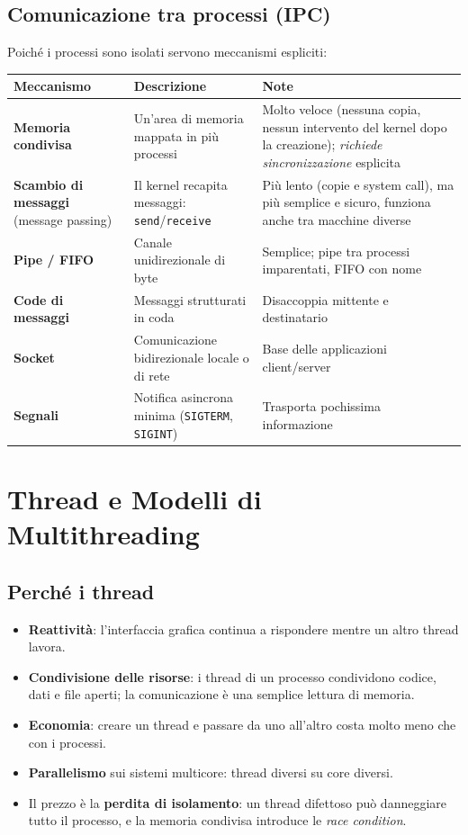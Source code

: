 \subsection{Comunicazione tra processi (IPC)}
Poiché i processi sono isolati servono meccanismi espliciti:
\begin{center}
\small
\begin{tabularx}{\textwidth}{@{}>{\raggedright\arraybackslash}p{3.3cm}XX@{}}
\toprule
\textbf{Meccanismo} & \textbf{Descrizione} & \textbf{Note} \\
\midrule
\textbf{Memoria condivisa} & Un'area di memoria mappata in più processi & Molto veloce (nessuna copia, nessun intervento del kernel dopo la creazione); \emph{richiede sincronizzazione} esplicita \\
\textbf{Scambio di messaggi} (message passing) & Il kernel recapita messaggi: \texttt{send}/\texttt{receive} & Più lento (copie e system call), ma più semplice e sicuro, funziona anche tra macchine diverse \\
\textbf{Pipe / FIFO} & Canale unidirezionale di byte & Semplice; pipe tra processi imparentati, FIFO con nome \\
\textbf{Code di messaggi} & Messaggi strutturati in coda & Disaccoppia mittente e destinatario \\
\textbf{Socket} & Comunicazione bidirezionale locale o di rete & Base delle applicazioni client/server \\
\textbf{Segnali} & Notifica asincrona minima (\texttt{SIGTERM}, \texttt{SIGINT}) & Trasporta pochissima informazione \\
\bottomrule
\end{tabularx}
\end{center}

\section{Thread e Modelli di Multithreading}

\subsection{Perché i thread}
\begin{itemize}
    \item \textbf{Reattività}: l'interfaccia grafica continua a rispondere mentre un altro thread lavora.
    \item \textbf{Condivisione delle risorse}: i thread di un processo condividono codice, dati e file aperti; la comunicazione è una semplice lettura di memoria.
    \item \textbf{Economia}: creare un thread e passare da uno all'altro costa molto meno che con i processi.
    \item \textbf{Parallelismo} sui sistemi multicore: thread diversi su core diversi.
    \item Il prezzo è la \textbf{perdita di isolamento}: un thread difettoso può danneggiare tutto il processo, e la memoria condivisa introduce le \emph{race condition}.
\end{itemize}


